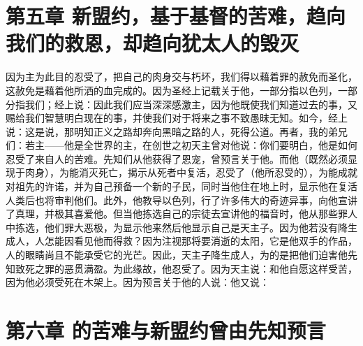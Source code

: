 \section{第五章 新盟约，基于基督的苦难，趋向我们的救恩，却趋向犹太人的毁灭}

因为主为此目的忍受了，把自己的肉身交与朽坏，我们得以藉着罪的赦免而圣化，这赦免是藉着他所洒的血完成的。因为圣经上记载关于他，一部分指以色列，一部分指我们；经上说：因此我们应当深深感激主，因为他既使我们知道过去的事，又赐给我们智慧明白现在的事，并使我们对于将来之事不致愚昧无知。如今，经上说：这是说，那明知正义之路却奔向黑暗之路的人，死得公道。再者，我的弟兄们：若主——他是全世界的主，在创世之初天主曾对他说：你们要明白，他是如何忍受了来自人的苦难。先知们从他获得了恩宠，曾预言关于他。而他（既然必须显现于肉身），为能消灭死亡，揭示从死者中复活，忍受了（他所忍受的），为能成就对祖先的许诺，并为自己预备一个新的子民，同时当他住在地上时，显示他在复活人类后也将审判他们。此外，他教导以色列，行了许多伟大的奇迹异事，向他宣讲了真理，并极其喜爱他。但当他拣选自己的宗徒去宣讲他的福音时，他从那些罪人中拣选，他们罪大恶极，为显示他来然后他显示自己是天主子。因为他若没有降生成人，人怎能因看见他而得救？因为注视那将要消逝的太阳，它是他双手的作品，人的眼睛尚且不能承受它的光芒。因此，天主子降生成人，为的是把他们迫害他先知致死之罪的恶贯满盈。为此缘故，他忍受了。因为天主说：和他自愿这样受苦，因为他必须受死在木架上。因为预言关于他的人说：他又说：\par


\section{第六章 的苦难与新盟约曾由先知预言}

